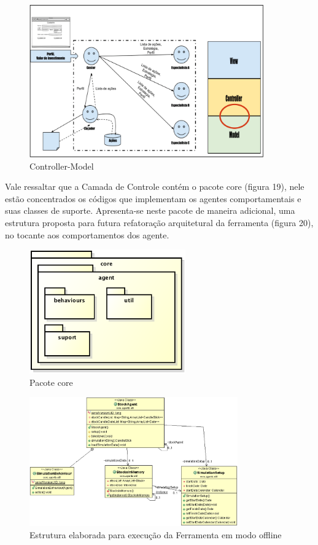 \begin{figure}[h]
\centering
\label{f18}
\includegraphics[width=0.9\textwidth]{figuras/f25}
\caption{Controller-Model}
\end{figure}
\FloatBarrier

Vale ressaltar que a Camada de Controle contém o pacote core (figura 19), nele estão concentrados os códigos que implementam os agentes comportamentais e suas classes de suporte. Apresenta-se neste pacote de maneira adicional, uma estrutura proposta para futura refatoração arquitetural da ferramenta (figura 20), no tocante aos comportamentos dos agente.

\begin{figure}[h]
\centering
\label{f19}
\includegraphics[width=0.6\textwidth]{figuras/pacoteAgents}
\caption{Pacote core}
\end{figure}

\begin{figure}[h]
\centering
\label{f20}
\includegraphics[width=0.8\textwidth]{figuras/classesUtil}
\caption{Estrutura elaborada para execução da Ferramenta em modo offline}
\end{figure}

